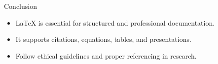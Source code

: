 \documentclass{beamer}
\begin{document}
\begin{frame}{Conclusion}
    \begin{itemize}
        \item LaTeX is essential for structured and professional documentation.
        \item It supports citations, equations, tables, and presentations.
        \item Follow ethical guidelines and proper referencing in research.
    \end{itemize}
\end{frame}
\end{document}
